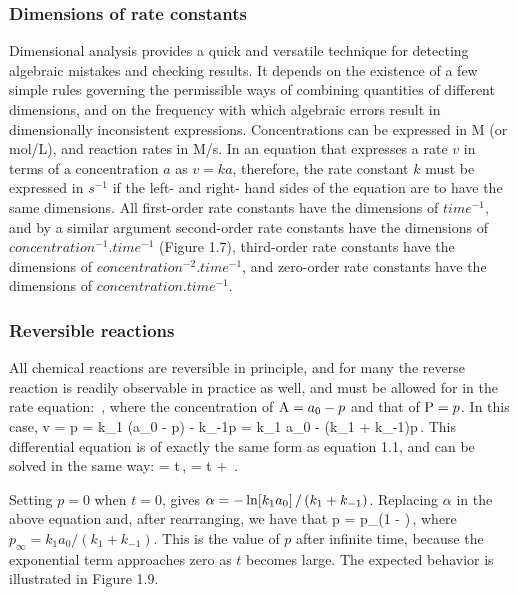 \subsubsection{Dimensions of rate constants}
Dimensional analysis provides a quick and versatile technique for detecting algebraic mistakes and checking results. It depends on the existence of a few simple rules governing the permissible ways of combining quantities of different dimensions, and on the frequency with which algebraic errors result in dimensionally inconsistent expressions. Concentrations can be expressed in \si{M} (or \si{mol/L}), and reaction rates in \si{M/s}. In an equation that expresses a rate $v$ in terms of a concentration $a$ as $v = ka$, therefore, the rate constant $k$ must be expressed in $\si{s^{−1}}$ if the left- and right- hand sides of the equation are to have the same dimensions. All first-order rate constants have the dimensions of $\si{time^{−1}}$, and by a similar argument second-order rate constants have the dimensions of $\si{concentration^{−1}.time^{−1}}$ (Figure 1.7), third-order rate constants have the dimensions of $\si{concentration^{−2}.time^{−1}}$, and zero-order rate constants have the dimensions of $\si{concentration.time^{−1}}$.

\subsubsection{Reversible reactions}
All chemical reactions are reversible in principle, and for many the reverse reaction is readily observable in practice as well, and must be allowed for in the rate equation:
\beq
{}\,,
\eeq
where the concentration of $\ce A = a_0 - p$ and that of $\ce P = p$. In this case,
\beq
v = \dt p
  = k_1 \left(a_0 - p\right) - k_{-1}p
  = k_1 a_0 - \left(k_1 + k_{-1}\right)p\,.
\eeq
This differential equation is of exactly the same form as equation 1.1, and can be solved in the same way:
\beq
\int {} = \int\dx t\,,\implies
{} = t + \alpha\,.
\eeq

Setting $p = 0$ when $t = 0$, gives $\alpha = -\ln\!\left[{k_1a_0}\right]/\left(k_1 + k_{-1}\right)$. Replacing $\alpha$ in the above equation and, after rearranging, we have that
\beq
p = p_\infty\left(1 - \exp{}\right)\,,
\eeq
where $p_\infty = k_1a_0/\left(k_1 + k_{-1}\right)$. This is the value of $p$ after infinite time, because the exponential term approaches zero as $t$ becomes large. The expected behavior is illustrated in Figure 1.9.


